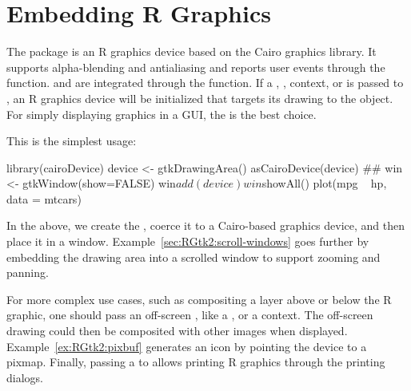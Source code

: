 \section{Embedding R Graphics}
\label{sec:gtk-widget-graphics}


The package  is an R graphics device based on the
Cairo graphics library.  It supports alpha-blending and antialiasing
and reports user events through the 
function.  and  are integrated through the
 function. If a ,
,  context, or 
is passed to , an R graphics device will be
initialized that targets its drawing to the object. For simply
displaying graphics in a GUI, the  is the best
choice. 

This is the simplest usage:
\begin{Schunk}
\begin{Sinput}
 library(cairoDevice)
 device <- gtkDrawingArea()
 asCairoDevice(device)
 ##
 win <- gtkWindow(show=FALSE)
 win$add(device)
 win$showAll()
 plot(mpg ~ hp, data = mtcars)
\end{Sinput}
\end{Schunk}
%
In the above, we create the , coerce it to a
Cairo-based graphics device, and then place it in a
window. Example~\ref{sec:RGtk2:scroll-windows} goes further by
embedding the drawing area into a scrolled window to support zooming
and panning.

For more complex use cases, such as compositing a layer above or below
the R graphic, one should pass an off-screen , like
a , or a  context. The off-screen
drawing could then be composited with other images when
displayed. Example~\ref{ex:RGtk2:pixbuf} generates an icon by pointing
the device to a pixmap. Finally, passing a  to
 allows printing R graphics through the \GTK\/
printing dialogs.

